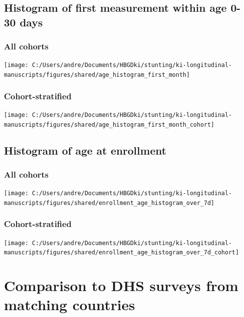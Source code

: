 \documentclass[9pt,]{book}
\begin{document}
\section{Histogram of first measurement within age 0-30
days}\label{histogram-of-first-measurement-within-age-0-30-days}

\subsection{All cohorts}\label{all-cohorts}

\texttt{[image: C:/Users/andre/Documents/HBGDki/stunting/ki-longitudinal-manuscripts/figures/shared/age\_histogram\_first\_month]}

\subsection{Cohort-stratified}\label{cohort-stratified}

\texttt{[image: C:/Users/andre/Documents/HBGDki/stunting/ki-longitudinal-manuscripts/figures/shared/age\_histogram\_first\_month\_cohort]}

\section{Histogram of age at
enrollment}\label{histogram-of-age-at-enrollment}

\subsection{All cohorts}\label{all-cohorts-1}

\texttt{[image: C:/Users/andre/Documents/HBGDki/stunting/ki-longitudinal-manuscripts/figures/shared/enrollment\_age\_histogram\_over\_7d]}

\subsection{Cohort-stratified}\label{cohort-stratified-1}

\texttt{[image: C:/Users/andre/Documents/HBGDki/stunting/ki-longitudinal-manuscripts/figures/shared/enrollment\_age\_histogram\_over\_7d\_cohort]}

\chapter{Comparison to DHS surveys from matching countries}\label{DHS}
\end{document}

